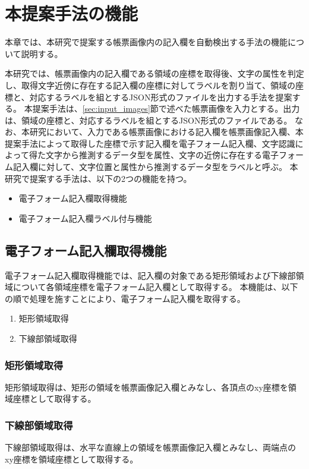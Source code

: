 \chapter{本提案手法の機能}\label{cha:Function}
本章では、本研究で提案する帳票画像内の記入欄を自動検出する手法の機能について説明する。

本研究では、帳票画像内の記入欄である領域の座標を取得後、文字の属性を判定し、取得文字近傍に存在する記入欄の座標に対してラベルを割り当て、領域の座標と、対応するラベルを組とするJSON形式のファイルを出力する手法を提案する。
本提案手法は、\ref{sec:input_images}節で述べた帳票画像を入力とする。出力は、領域の座標と、対応するラベルを組とするJSON形式のファイルである。
なお、本研究において、入力である帳票画像における記入欄を帳票画像記入欄、本提案手法によって取得した座標で示す記入欄を電子フォーム記入欄、文字認識によって得た文字から推測するデータ型を属性、文字の近傍に存在する電子フォーム記入欄に対して、文字位置と属性から推測するデータ型をラベルと呼ぶ。
本研究で提案する手法は、以下の2つの機能を持つ。

\begin{itemize}
  \item 電子フォーム記入欄取得機能
  \item 電子フォーム記入欄ラベル付与機能
\end{itemize}


\section{電子フォーム記入欄取得機能}\label{sec:eform_write_space_obtainment_feature}
電子フォーム記入欄取得機能では、記入欄の対象である矩形領域および下線部領域について各領域座標を電子フォーム記入欄として取得する。
本機能は、以下の順で処理を施すことにより、電子フォーム記入欄を取得する。

\begin{enumerate}
  \item 矩形領域取得
  \item 下線部領域取得
\end{enumerate}

\subsection{矩形領域取得}\label{subsec:rect_coords_obtainment}
矩形領域取得は、矩形の領域を帳票画像記入欄とみなし、各頂点のxy座標を領域座標として取得する。

\subsection{下線部領域取得}\label{subsec:underline_coords_obtainment}
下線部領域取得は、水平な直線上の領域を帳票画像記入欄とみなし、両端点のxy座標を領域座標として取得する。


